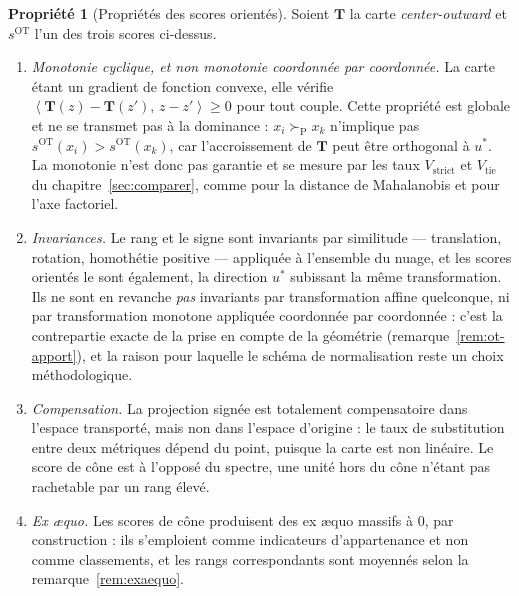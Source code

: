 \documentclass[11pt,a4paper]{article}
\theoremstyle{definition}
\newtheorem{propriete}{Propriété}[section]
\theoremstyle{remark}
\newcommand{\scal}[2]{\left\langle #1 ,\, #2 \right\rangle}
\newcommand{\Tmap}{\mathbf{T}}
\newcommand{\pareto}{\succ_{\mathrm{P}}}
\begin{document}
\begin{propriete}[Propriétés des scores orientés]
  \label{prop:ot-proprietes}
  Soient $\Tmap$ la carte \emph{center-outward} et $s^{\mathrm{OT}}$ l'un des trois scores
  ci-dessus.

  \medskip

  \begin{enumerate}[nosep,leftmargin=1.8em]
    \item \emph{Monotonie cyclique, et non monotonie coordonnée par coordonnée.} La carte
    étant un gradient de fonction convexe, elle vérifie
    $\scal{\Tmap(z) - \Tmap(z')}{z - z'} \ge 0$ pour tout couple. Cette propriété est
    globale et ne se transmet pas à la dominance : $x_i \pareto x_k$ n'implique pas
    $s^{\mathrm{OT}}(x_i) > s^{\mathrm{OT}}(x_k)$, car l'accroissement de $\Tmap$ peut être
    orthogonal à $u^{*}$. La monotonie n'est donc pas garantie et se mesure par les taux
    $V_{\mathrm{strict}}$ et $V_{\mathrm{tie}}$ du chapitre~\ref{sec:comparer}, comme pour
    la distance de Mahalanobis et pour l'axe factoriel.
    \item \emph{Invariances.} Le rang et le signe sont invariants par similitude ---
    translation, rotation, homothétie positive --- appliquée à l'ensemble du nuage, et les
    scores orientés le sont également, la direction $u^{*}$ subissant la même
    transformation. Ils ne sont en revanche \emph{pas} invariants par transformation affine
    quelconque, ni par transformation monotone appliquée coordonnée par coordonnée : c'est
    la contrepartie exacte de la prise en compte de la géométrie
    (remarque~\ref{rem:ot-apport}), et la raison pour laquelle le schéma de normalisation
    reste un choix méthodologique.
    \item \emph{Compensation.} La projection signée est totalement compensatoire dans
    l'espace transporté, mais non dans l'espace d'origine : le taux de substitution entre
    deux métriques dépend du point, puisque la carte est non linéaire. Le score de cône est
    à l'opposé du spectre, une unité hors du cône n'étant pas rachetable par un rang élevé.
    \item \emph{Ex \ae quo.} Les scores de cône produisent des ex \ae quo massifs à $0$, par
    construction : ils s'emploient comme indicateurs d'appartenance et non comme
    classements, et les rangs correspondants sont moyennés selon la
    remarque~\ref{rem:exaequo}.
  \end{enumerate}
\end{propriete}
\end{document}

